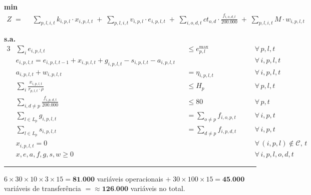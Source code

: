 \documentclass[12pt, a4paper]{article}
\begin{document}
\begin{mdframed}[backgroundcolor=blue!5, linecolor=ballblue, linewidth=2pt,
  innertopmargin=14pt, innerbottommargin=14pt,
  innerleftmargin=14pt, innerrightmargin=14pt]

\textbf{\color{ballblue}min}
\[
  \begin{aligned}
    Z \;=\;\;
    & \sum_{p,l,i,t} k_{i,p,l} \cdot x_{i,p,l,t}
      \;+\; \sum_{p,l,i,t} v_{i,p,l} \cdot e_{i,p,l,t}
      \;+\; \sum_{i,o,d,t} ct_{o,d} \cdot \tfrac{f_{i,o,d,t}}{200{.}000}
      \;+\; \sum_{p,l,i,t} M \cdot w_{i,p,l,t}
  \end{aligned}
\]

\textbf{\color{ballblue}s.a.}
\begin{alignat}{3}
  &\textstyle\sum_{i} e_{i,p,l,t}
    &&\leq e^{\max}_{p,l}
    &&\quad\forall\,p,l,t \tag{R1}\\[6pt]
  &e_{i,p,l,t} = e_{i,p,l,t-1} + x_{i,p,l,t} + g_{i,p,l,t} - s_{i,p,l,t} - a_{i,p,l,t}
    &&
    &&\quad\forall\,i,p,l,t \tag{R2}\\[6pt]
  &a_{i,p,l,t} + w_{i,p,l,t}
    &&= \eta_{i,p,l,t}
    &&\quad\forall\,i,p,l,t \tag{R3}\\[6pt]
  &\textstyle\sum_{i} \tfrac{x_{i,p,l,t}}{r_{p,l,t}\cdot\rho}
    &&\leq H_{p}
    &&\quad\forall\,p,l,t \tag{R4}\\[6pt]
  &\textstyle\sum_{i,d\neq p} \tfrac{f_{i,p,d,t}}{200{.}000}
    &&\leq 80
    &&\quad\forall\,p,t \tag{R5}\\[6pt]
  &\textstyle\sum_{l \in L_p} g_{i,p,l,t}
    &&= \textstyle\sum_{o \neq p} f_{i,o,p,t}
    &&\quad\forall\,i,p,t \tag{R6}\\[6pt]
  &\textstyle\sum_{l \in L_p} s_{i,p,l,t}
    &&= \textstyle\sum_{d \neq p} f_{i,p,d,t}
    &&\quad\forall\,i,p,t \tag{R7}\\[6pt]
  &x_{i,p,l,t} = 0
    &&
    &&\quad\forall\,(i,p,l)\notin\mathcal{C},\,t \tag{R8}\\[6pt]
  &x,e,a,f,g,s,w \geq 0
    &&
    &&\quad\forall\,i,p,l,o,d,t \tag{R9}
\end{alignat}
\end{mdframed}

\vspace{8pt}
{\color{accentgray}\rule{\linewidth}{0.5pt}}
\begin{center}
  \small\color{darkgray}
  $6 \times 30 \times 10 \times 3 \times 15 = \mathbf{81{.}000}$ vari\'{a}veis operacionais
  $+\; 30 \times 100 \times 15 = \mathbf{45{.}000}$ vari\'{a}veis de transfer\^{e}ncia
  $= \approx \mathbf{126{.}000}$ vari\'{a}veis no total.
\end{center}
\end{document}
